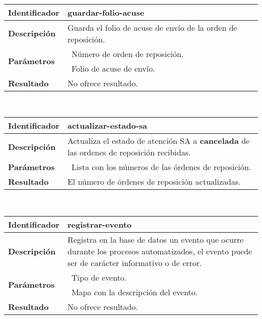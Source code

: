 	\vspace{5mm}\\
	\begin{tabular}{|p{}|p{}|}
		\hline
		\textbf{Identificador}	& \textbf{guardar-folio-acuse}\\
		\hline
		\hline
		\textbf{Descripción}	& Guarda el folio de acuse de envío de la orden de reposición.\\
		\hline
		\multirow{2}{*}{\textbf{Parámetros}} 	& \textbullet\, Número de orden de reposición.\\
												& \textbullet\, Folio de acuse de envío.\\
		\hline
		\textbf{Resultado}		& No ofrece resultado.\\
		\hline
	\end{tabular}
	\vspace{5mm}\\
	\begin{tabular}{|p{}|p{}|}
		\hline
		\textbf{Identificador}	& \textbf{actualizar-estado-sa}\\
		\hline
		\hline
		\textbf{Descripción}	& Actualiza el estado de atención SA a \textbf{cancelada} de las ordenes de reposición recibidas.\\
		\hline
		\textbf{Parámetros} 	& \textbullet\, Lista con los números de las órdenes de reposición.\\
		\hline
		\textbf{Resultado}		& El número de órdenes de reposición actualizadas.\\
		\hline
	\end{tabular}
	\vspace{5mm}\\
	\begin{tabular}{|p{}|p{}|}
		\hline
		\textbf{Identificador}	& \textbf{registrar-evento}\\
		\hline
		\hline
		\textbf{Descripción}	& Registra en la base de datos un evento que ocurre durante los procesos automatizados, el evento puede ser de carácter informativo o de error.\\
		\hline
		\multirow{2}{*}{\textbf{Parámetros}}	& \textbullet\, Tipo de evento.\\
												& \textbullet\, Mapa con la descripción del evento.\\
		\hline
		\textbf{Resultado}		& No ofrece resultado.\\
		\hline
	\end{tabular}
	\vspace{5mm}

